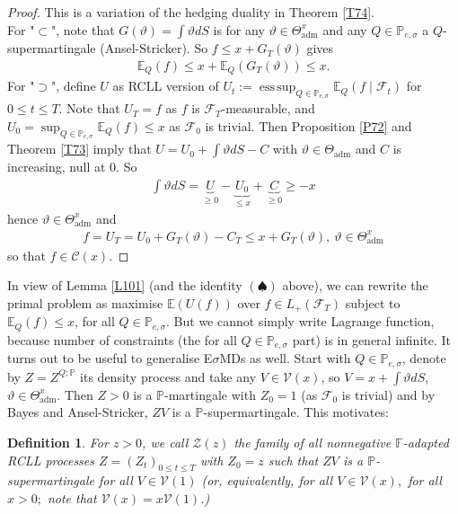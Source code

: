 \documentclass[12pt,a4paper, twoside]{article}
\newtheorem{defn}{Definition}[section]
\theoremstyle{definition}
\newcommand{\EE}{\mathbb{E}} %
\newcommand{\PP}{\mathbb{P}} %
\DeclareMathOperator*{\esssup}{ess\,sup}
\begin{document}
\begin{proof} This is a variation of the hedging duality in Theorem \ref{T74}. \\
For "$\subset$", note that $G( \vartheta) = \int \vartheta dS$ is for any $\vartheta \in \Theta_\text{adm}^x$ and any $Q \in \PP_{e, \sigma}$ a $Q$-supermartingale (Ansel-Stricker). So $f \leq x + G_T( \vartheta)$ gives \begin{align*}
\EE_Q(f) \leq x + \EE_Q(G_T( \vartheta)) \leq x. 
\end{align*}
For "$\supset$", define $U$ as RCLL version of $U_t:= \esssup_{Q \in \PP_{e, \sigma}} \EE_Q(f \mid \mathcal{F}_t)$ for $0 \leq t \leq T$. Note that $U_T=f$ as $f$ is $\mathcal{F}_T$-measurable, and $U_0 = \sup_{Q \in \PP_{e, \sigma}} \EE_Q(f) \leq x$ as $\mathcal{F}_0$ is trivial. Then Proposition \ref{P72} and Theorem \ref{T73} imply that $U= U_0 + \int \vartheta dS -C$ with $\vartheta \in \Theta_\text{adm}$ and $C$ is increasing, null at $0$. So \begin{align*}
\int \vartheta dS = \underbrace{U}_{ \geq 0}-\underbrace{U_0}_{ \leq x}+\underbrace{C}_{ \geq 0} \geq -x
\end{align*}
hence $\vartheta \in \Theta_\text{adm}^x$ and 
\begin{align*}
f= U_T=U_0 + G_T( \vartheta)-C_T \leq x + G_T( \vartheta), \ \vartheta \in \Theta_\text{adm}^x
\end{align*}
so that $f \in \mathcal{C}(x)$. 
\end{proof}
In view of Lemma \ref{L101} (and the identity $(\spadesuit)$ above), we can rewrite the primal problem as maximise $\EE(U(f))$ over $f \in L_+( \mathcal{F}_T)$ subject to $\EE_Q(f) \leq x$, for all $Q \in \PP_{e, \sigma}$. But we cannot simply write Lagrange function, because number of constraints (the for all $Q \in \PP_{e, \sigma}$ part) is in general infinite. 
\newpage
It turns out to be useful to generalise E$\sigma$MDs as well. Start with $Q \in \PP_{e, \sigma}$, denote by $Z=Z^{Q;\PP}$ its density process and take any $V \in \mathcal{V}(x)$, so $V= x + \int \vartheta dS$, $\vartheta \in \Theta_\text{adm}^x$. Then $Z>0$ is a $\PP$-martingale with $Z_0=1$ (as $\mathcal{F}_0$ is trivial) and by Bayes and Ansel-Stricker, $ZV$ is a $\PP$-supermartingale. This motivates: 
\begin{defn} For $z>0$, we call $\mathcal{Z}(z)$ the family of all nonnegative $\mathbb{F}$-adapted RCLL processes $Z=(Z_t)_{0 \leq t \leq T}$ with $Z_0=z$ such that $ZV$ is a $\PP$-supermartingale for all $V \in \mathcal{V}(1)$ (or, equivalently, for all $V \in \mathcal{V}(x),$ for all $x >0;$ note that $\mathcal{V}(x) = x  \mathcal{V}(1)$.)
\end{defn}
\end{document}
